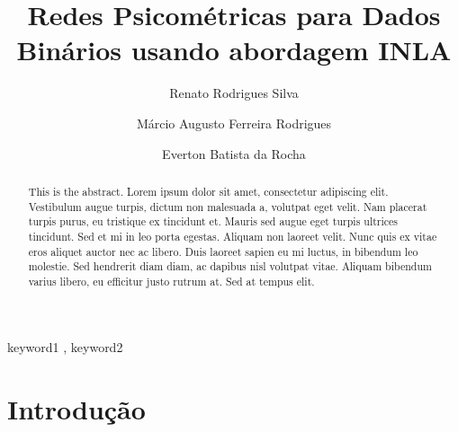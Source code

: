 \documentclass[
  super,
  preprint,
  3p]{elsarticle}
\begin{document}
\begin{frontmatter}
\title{Redes Psicométricas para Dados Binários usando abordagem INLA}
\author[1]{Renato Rodrigues Silva%
%
}
\author[1]{Márcio Augusto Ferreira Rodrigues%
%
}
\author[1]{Everton Batista da Rocha%
%
}




        
\begin{abstract}
This is the abstract. Lorem ipsum dolor sit amet, consectetur adipiscing
elit. Vestibulum augue turpis, dictum non malesuada a, volutpat eget
velit. Nam placerat turpis purus, eu tristique ex tincidunt et. Mauris
sed augue eget turpis ultrices tincidunt. Sed et mi in leo porta
egestas. Aliquam non laoreet velit. Nunc quis ex vitae eros aliquet
auctor nec ac libero. Duis laoreet sapien eu mi luctus, in bibendum leo
molestie. Sed hendrerit diam diam, ac dapibus nisl volutpat vitae.
Aliquam bibendum varius libero, eu efficitur justo rutrum at. Sed at
tempus elit.
\end{abstract}





\begin{keyword}
    keyword1 \sep 
    keyword2
\end{keyword}
\end{frontmatter}
    
\section{Introdução}\label{introduuxe7uxe3o}
\end{document}
